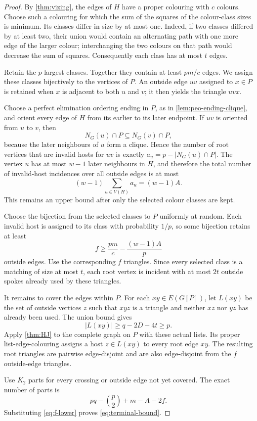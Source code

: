 \documentclass[11pt,reqno]{amsart}
\numberwithin{equation}{section}
\theoremstyle{definition}
\theoremstyle{remark}
\begin{document}
\begin{proof}
By \cref{thm:vizing}, the edges of $H$ have a proper colouring with $c$
colours.  Choose such a colouring for which the sum of the squares of the
colour-class sizes is minimum.  Its classes differ in size by at most one.
Indeed, if two classes differed by at least two, their union would contain an
alternating path with one more edge of the larger colour; interchanging the
two colours on that path would decrease the sum of squares.  Consequently
each class has at most $t$ edges.

Retain the $p$ largest classes.  Together they contain at least $pm/c$ edges.
We assign these classes bijectively to the vertices of $P$.  An outside edge
$uv$ assigned to $x\in P$ is retained when $x$ is adjacent to both $u$ and
$v$; it then yields the triangle $uvx$.

Choose a perfect elimination ordering ending in $P$, as in
\cref{lem:peo-ending-clique}, and orient every edge of $H$ from its earlier to
its later endpoint.  If $uv$ is oriented from $u$ to $v$, then
\[
  N_G(u)\cap P\subseteq N_G(v)\cap P,
\]
because the later neighbours of $u$ form a clique.  Hence the number of root
vertices that are invalid hosts for $uv$ is exactly
$a_u=p-|N_G(u)\cap P|$.  The vertex $u$ has at most $w-1$ later neighbours in
$H$, and therefore the total number of invalid-host incidences over all
outside edges is at most
\[
  (w-1)\sum_{u\in V(H)}a_u=(w-1)A.
\]
This remains an upper bound after only the selected colour classes are kept.

Choose the bijection from the selected classes to $P$ uniformly at random.
Each invalid host is assigned to its class with probability $1/p$, so some
bijection retains at least
\begin{equation}\label{eq:f-lower}
  f\geq \frac{pm}{c}-\frac{(w-1)A}{p}
\end{equation}
outside edges.  Use the corresponding $f$ triangles.  Since every selected
class is a matching of size at most $t$, each root vertex is incident with at
most $2t$ outside spokes already used by these triangles.

It remains to cover the edges within $P$.  For each $xy\in E(G[P])$, let
$L(xy)$ be the set of outside vertices $z$ such that $xyz$ is a triangle and
neither $xz$ nor $yz$ has already been used.  The union bound gives
\[
  |L(xy)|\geq q-2D-4t\geq p.
\]
Apply \cref{thm:HJ} to the complete graph on $P$ with these actual lists.  Its
proper list-edge-colouring assigns a host $z\in L(xy)$ to every root edge
$xy$.  The resulting root triangles are pairwise edge-disjoint and are also
edge-disjoint from the $f$ outside-edge triangles.

Use $K_2$ parts for every crossing or outside edge not yet covered.  The exact
number of parts is
\[
  pq-\binom p2+m-A-2f.
\]
Substituting \eqref{eq:f-lower} proves \eqref{eq:terminal-bound}.
\end{proof}
\end{document}
